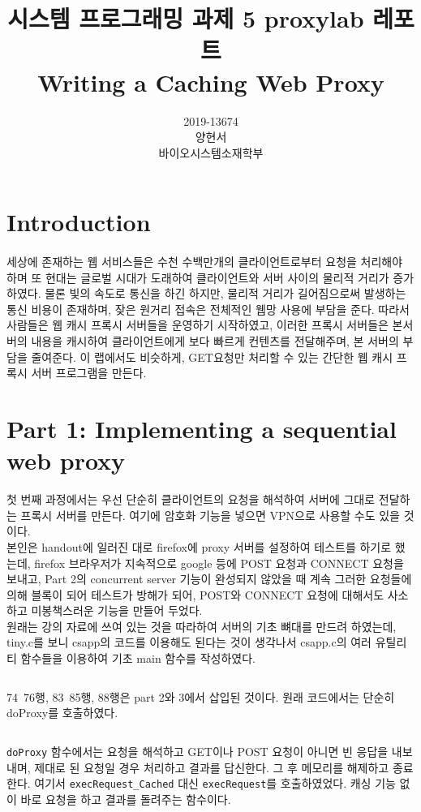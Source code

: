 \documentclass{report}
\title{시스템 프로그래밍 과제 5 proxylab 레포트 \\
\large Writing a Caching Web Proxy}
\date{}
\author{
  2019-13674\\
  양현서 \\
  바이오시스템소재학부\\
}
\begin{document}
\maketitle
\tableofcontents

\section{Introduction}
\paragraph{}
세상에 존재하는 웹 서비스들은 수천 수백만개의 클라이언트로부터 요청을 처리해야 하며 또 현대는 글로벌 시대가 도래하여 클라이언트와 서버 사이의 물리적 거리가 증가하였다. 물론 빛의 속도로 통신을 하긴 하지만, 물리적 거리가 길어짐으로써 발생하는 통신 비용이 존재하며, 잦은 원거리 접속은 전체적인 웹망 사용에 부담을 준다. 따라서 사람들은 웹 캐시 프록시 서버들을 운영하기 시작하였고, 이러한 프록시 서버들은 본서버의 내용을 캐시하여 클라이언트에게 보다 빠르게 컨텐츠를 전달해주며, 본 서버의 부담을 줄여준다. 이 랩에서도 비슷하게, GET요청만 처리할 수 있는 간단한 웹 캐시 프록시 서버 프로그램을 만든다.

\section{Part 1: Implementing a sequential web proxy}
첫 번째 과정에서는 우선 단순히 클라이언트의 요청을 해석하여 서버에 그대로 전달하는 프록시 서버를 만든다. 여기에 암호화 기능을 넣으면 VPN으로 사용할 수도 있을 것이다. \\
본인은 handout에 일러진 대로 firefox에 proxy 서버를 설정하여 테스트를 하기로 했는데, firefox 브라우저가 지속적으로 google 등에 POST 요청과 CONNECT 요청을 보내고, Part 2의 concurrent server 기능이 완성되지 않았을 때 계속 그러한 요청들에 의해 블록이 되어 테스트가 방해가 되어, POST와 CONNECT 요청에 대해서도 사소하고 미봉책스러운 기능을 만들어 두었다.
\\
원래는 강의 자료에 쓰여 있는 것을 따라하여 서버의 기초 뼈대를 만드려 하였는데, tiny.c를 보니 csapp의 코드를 이용해도 된다는 것이 생각나서 csapp.c의 여러 유틸리티 함수들을 이용하여 기초 main 함수를 작성하였다.
\inputminted[firstline=60,lastline=90, linenos, breaklines]{C}{../submit/proxy.c}
74~76행, 83~85행, 88행은 part 2와 3에서 삽입된 것이다. 원래 코드에서는 단순히 doProxy를 호출하였다.
\inputminted[firstline=136,lastline=151, linenos, breaklines]{C}{../submit/proxy.c}
\lstinline{doProxy} 함수에서는 요청을 해석하고 GET이나 POST 요청이 아니면 빈 응답을 내보내며, 제대로 된 요청일 경우 처리하고 결과를 답신한다. 그 후 메모리를 해제하고 종료한다. 여기서 \lstinline{execRequest_Cached} 대신 \lstinline{execRequest}를 호출하였었다. 캐싱 기능 없이 바로 요청을 하고 결과를 돌려주는 함수이다.
\end{document}
